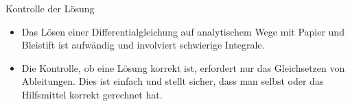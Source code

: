 \begin{frame}{Kontrolle der Lösung}
  \begin{itemize}
  \item Das Lösen einer Differentialgleichung auf analytischem Wege mit
  \glqq{}Papier und Bleistift\grqq{} ist aufwändig und involviert
  schwierige Integrale.
\item Die Kontrolle, ob eine Lösung korrekt ist, erfordert nur das
  Gleichsetzen von Ableitungen. Dies ist einfach und stellt sicher,
  dass man selbst oder das Hilfsmittel korrekt gerechnet hat.
  \end{itemize}
\end{frame}

